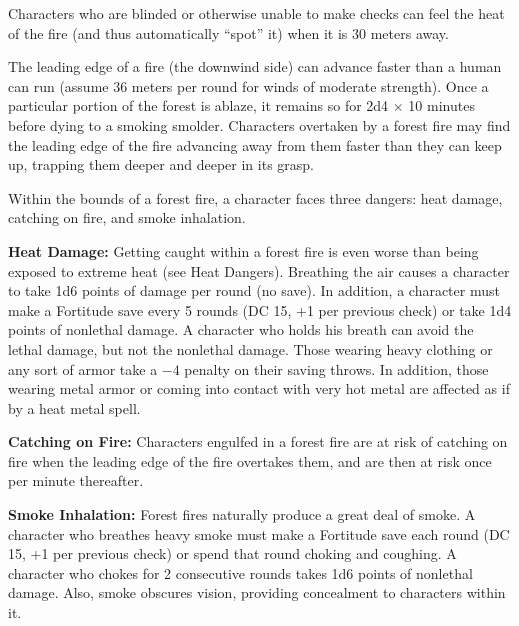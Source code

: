 Characters who are blinded or otherwise unable to make  checks can feel the heat of the fire (and thus automatically ``spot'' it) when it is 30 meters away.

The leading edge of a fire (the downwind side) can advance faster than a human can run (assume 36 meters per round for winds of moderate strength). Once a particular portion of the forest is ablaze, it remains so for 2d4 $\times$ 10 minutes before dying to a smoking smolder. Characters overtaken by a forest fire may find the leading edge of the fire advancing away from them faster than they can keep up, trapping them deeper and deeper in its grasp.

Within the bounds of a forest fire, a character faces three dangers: heat damage, catching on fire, and smoke inhalation.

\textbf{Heat Damage:} Getting caught within a forest fire is even worse than being exposed to extreme heat (see Heat Dangers). Breathing the air causes a character to take 1d6 points of damage per round (no save). In addition, a character must make a Fortitude save every 5 rounds (DC 15, +1 per previous check) or take 1d4 points of nonlethal damage. A character who holds his breath can avoid the lethal damage, but not the nonlethal damage. Those wearing heavy clothing or any sort of armor take a $-4$ penalty on their saving throws. In addition, those wearing metal armor or coming into contact with very hot metal are affected as if by a heat metal spell.

\textbf{Catching on Fire:} Characters engulfed in a forest fire are at risk of catching on fire when the leading edge of the fire overtakes them, and are then at risk once per minute thereafter.

\textbf{Smoke Inhalation:} Forest fires naturally produce a great deal of smoke. A character who breathes heavy smoke must make a Fortitude save each round (DC 15, +1 per previous check) or spend that round choking and coughing. A character who chokes for 2 consecutive rounds takes 1d6 points of nonlethal damage. Also, smoke obscures vision, providing concealment to characters within it.